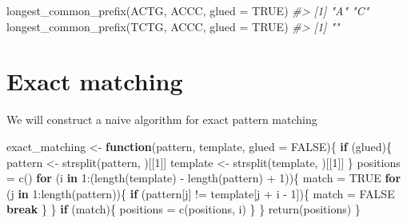 \documentclass[
]{book}
\newenvironment{Shaded}{\begin{snugshade}}{\end{snugshade}}
\newcommand{\AttributeTok}[1]{\textcolor[rgb]{0.77,0.63,0.00}{#1}}
\newcommand{\CommentTok}[1]{\textcolor[rgb]{0.56,0.35,0.01}{\textit{#1}}}
\newcommand{\ConstantTok}[1]{\textcolor[rgb]{0.00,0.00,0.00}{#1}}
\newcommand{\ControlFlowTok}[1]{\textcolor[rgb]{0.13,0.29,0.53}{\textbf{#1}}}
\newcommand{\DecValTok}[1]{\textcolor[rgb]{0.00,0.00,0.81}{#1}}
\newcommand{\FunctionTok}[1]{\textcolor[rgb]{0.00,0.00,0.00}{#1}}
\newcommand{\NormalTok}[1]{#1}
\newcommand{\OtherTok}[1]{\textcolor[rgb]{0.56,0.35,0.01}{#1}}
\newcommand{\SpecialCharTok}[1]{\textcolor[rgb]{0.00,0.00,0.00}{#1}}
\newcommand{\StringTok}[1]{\textcolor[rgb]{0.31,0.60,0.02}{#1}}
\begin{document}
\begin{Shaded}
\begin{Highlighting}[]
\FunctionTok{longest\_common\_prefix}\NormalTok{(}\StringTok{\textquotesingle{}ACTG\textquotesingle{}}\NormalTok{, }\StringTok{\textquotesingle{}ACCC\textquotesingle{}}\NormalTok{, }\AttributeTok{glued =} \ConstantTok{TRUE}\NormalTok{)}
\CommentTok{\#\textgreater{} [1] "A" "C"}
\FunctionTok{longest\_common\_prefix}\NormalTok{(}\StringTok{\textquotesingle{}TCTG\textquotesingle{}}\NormalTok{, }\StringTok{\textquotesingle{}ACCC\textquotesingle{}}\NormalTok{, }\AttributeTok{glued =} \ConstantTok{TRUE}\NormalTok{)}
\CommentTok{\#\textgreater{} [1] ""}
\end{Highlighting}
\end{Shaded}

\hypertarget{exact-matching}{%
\section{Exact matching}\label{exact-matching}}

We will construct a naive algorithm for exact pattern matching

\begin{Shaded}
\begin{Highlighting}[]
\NormalTok{exact\_matching }\OtherTok{\textless{}{-}} \ControlFlowTok{function}\NormalTok{(pattern, template, }\AttributeTok{glued =} \ConstantTok{FALSE}\NormalTok{)\{}
  \ControlFlowTok{if}\NormalTok{ (glued)\{}
\NormalTok{    pattern }\OtherTok{\textless{}{-}} \FunctionTok{strsplit}\NormalTok{(pattern, }\StringTok{\textquotesingle{}\textquotesingle{}}\NormalTok{)[[}\DecValTok{1}\NormalTok{]]}
\NormalTok{    template }\OtherTok{\textless{}{-}} \FunctionTok{strsplit}\NormalTok{(template, }\StringTok{\textquotesingle{}\textquotesingle{}}\NormalTok{)[[}\DecValTok{1}\NormalTok{]]}
\NormalTok{  \}}
\NormalTok{  positions }\OtherTok{=} \FunctionTok{c}\NormalTok{()}
  \ControlFlowTok{for}\NormalTok{ (i }\ControlFlowTok{in} \DecValTok{1}\SpecialCharTok{:}\NormalTok{(}\FunctionTok{length}\NormalTok{(template) }\SpecialCharTok{{-}} \FunctionTok{length}\NormalTok{(pattern) }\SpecialCharTok{+} \DecValTok{1}\NormalTok{))\{}
\NormalTok{    match }\OtherTok{=} \ConstantTok{TRUE}
    \ControlFlowTok{for}\NormalTok{ (j }\ControlFlowTok{in} \DecValTok{1}\SpecialCharTok{:}\FunctionTok{length}\NormalTok{(pattern))\{}
      \ControlFlowTok{if}\NormalTok{ (pattern[j] }\SpecialCharTok{!=}\NormalTok{ template[j }\SpecialCharTok{+}\NormalTok{ i }\SpecialCharTok{{-}} \DecValTok{1}\NormalTok{])\{}
\NormalTok{        match }\OtherTok{=} \ConstantTok{FALSE}
        \ControlFlowTok{break}
\NormalTok{      \}}
\NormalTok{    \}}
    \ControlFlowTok{if}\NormalTok{ (match)\{}
\NormalTok{      positions }\OtherTok{=} \FunctionTok{c}\NormalTok{(positions, i)}
\NormalTok{    \}}
\NormalTok{  \}}
  \FunctionTok{return}\NormalTok{(positions)}
\NormalTok{\}}
\end{Highlighting}
\end{Shaded}
\end{document}
